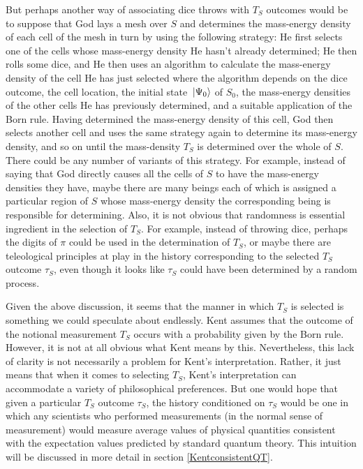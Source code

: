 But perhaps another way of associating dice throws with $T_S$ outcomes would be to suppose that God lays a mesh over $S$ and determines the mass-energy density of each cell of the mesh in turn by using the following strategy: He first selects one of the cells whose mass-energy density He hasn't already determined; He then rolls some dice, and He then uses an algorithm to calculate the mass-energy density of the cell He has just selected where the algorithm depends on the dice outcome, the cell location, the initial state $\ket*{\Psi_0}$ of $S_0$, the mass-energy densities of the other cells He has previously determined, and a suitable application of the Born rule. Having determined the mass-energy density of this cell, God then selects another cell and uses the same strategy again to determine its mass-energy density, and so on until the mass-density $T_S$ is determined over the whole of $S$. There could be any number of variants of this strategy. For example, instead of saying that God directly causes all the cells of $S$ to have the mass-energy densities they have, maybe there are many beings each of which is assigned a particular region of $S$ whose mass-energy density the corresponding being is responsible for determining. Also, it is not obvious that randomness is essential ingredient in the selection of $T_S$. For example, instead of throwing dice, perhaps the digits of $\pi$ could be used in the determination of $T_S$, or maybe there are teleological principles at play in the history corresponding to the selected $T_S$ outcome $\tau_S$, even though it looks like $\tau_S$ could have been determined by a random process. 

Given the above discussion, it seems that the manner in which $T_S$ is selected is something we could speculate about endlessly. Kent assumes that the outcome of the notional measurement $T_S$ occurs with a probability given by the Born rule. However, it is not at all obvious what Kent means by this. Nevertheless, this lack of clarity is not necessarily a problem for Kent's interpretation. Rather, it just means that when it comes to selecting $T_S$, Kent's interpretation can accommodate a variety of philosophical preferences. But one would hope that given a particular $T_S$ outcome $\tau_S$, the history conditioned on $\tau_S$ would be one in which any scientists who performed measurements (in the normal sense of measurement) would measure average values of physical quantities consistent with the expectation values predicted by standard quantum theory. This intuition will be discussed in more detail in section \ref{KentconsistentQT}.




